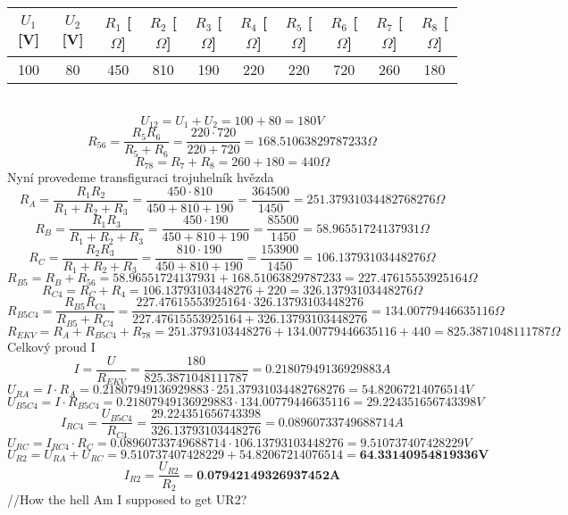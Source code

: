 \documentclass{article}
\begin{document}
\begin{tabular}{| c | c | c | c | c | c | c | c | c | c |}
  \hline
   $U_{1}$[V] & $U_{2}$ [V] & $R_{1}$ [$\Omega$]& $R_{2}$ [$\Omega$]& $R_{3}$ [$\Omega$]& $R_{4}$ [$\Omega$]& $R_{5}$ [$\Omega$]& $R_{6}$ [$\Omega$]& $R_{7}$ [$\Omega$]& $R_{8}$ [$\Omega$]\\
  \hline
  100 & 80 & 450 & 810 & 190 & 220 & 220 & 720 & 260 & 180\\
  \hline
\end{tabular}\\
\[
  U_{12} = U_{1} + U_{2} = 100 + 80 = 180V
\]
\[
  R_{56} = \displaystyle\frac{R_{5}R_{6}}{R_{5}+R_{6}}  = \displaystyle\frac{220 \cdot 720}{220 + 720} = 168.51063829787233 \Omega
\]
\[
  R_{78} = R_{7} + R_{8} = 260 + 180 = 440\Omega
\]
Nyní provedeme transfiguraci  trojuhelník hvězda
\[
  R_{A} = \displaystyle\frac{R_{1}R_{2}}{R_{1}+R_{2}+R_{3}}
  = \displaystyle\frac{450 \cdot 810}{450 + 810 + 190}
  = \displaystyle\frac{364500}{1450}
  = 251.37931034482768276 \Omega
\]
\[
  R_{B} = \displaystyle\frac{R_{1}R_{3}}{R_{1}+R_{2}+R_{3}}
  = \displaystyle\frac{450 \cdot 190}{450 + 810 + 190}
  = \displaystyle\frac{85500}{1450}
  = 58.96551724137931 \Omega
\]
\[
  R_{C} = \displaystyle\frac{R_{2}R_{3}}{R_{1}+R_{2}+R_{3}}
  = \displaystyle\frac{810 \cdot 190}{450 + 810 + 190}
  = \displaystyle\frac{153900}{1450}
  = 106.13793103448276 \Omega
\]
\[
  R_{B5} = R_{B} + R_{56} = 58.96551724137931 + 168.51063829787233 = 227.47615553925164 \Omega
\]
\[
  R_{C4} = R_{C} + R_{4} = 106.13793103448276 + 220 = 326.13793103448276 \Omega
\]
\[
  R_{B5C4} = \displaystyle\frac{R_{B5}R_{C4}}{R_{B5}+R_{C4}}
  = \displaystyle\frac{227.47615553925164 \cdot  326.13793103448276}{227.47615553925164 + 326.13793103448276}
  = 134.00779446635116 \Omega
\]
\[
  R_{EKV} = R_{A} + R_{B5C4} + R_{78} = 251.3793103448276 + 134.00779446635116 + 440
  = 825.3871048111787 \Omega
\]
Celkový proud I
\[
  I = \displaystyle\frac{U}{R_{EKV}} = \displaystyle\frac{180}{825.3871048111787} = 0.21807949136929883A
\]
\[
  U_{RA} = I \cdot R_A
  = 0.21807949136929883 \cdot 251.37931034482768276
  = 54.82067214076514V
\]
\[
  U_{B5C4} = I \cdot R_{B5C4}
 = 0.21807949136929883 \cdot 134.00779446635116
 = 29.224351656743398V
\]
\[
  I_{RC4} = \displaystyle\frac{U_{B5C4}}{R_{C4}} 
 = \displaystyle\frac{29.224351656743398}{326.13793103448276}
 = 0.08960733749688714 A
\] 
\[
  U_{RC} = I_{RC4} \cdot R_C
  = 0.08960733749688714  \cdot 106.13793103448276
  = 9.510737407428229 V
\]
\[
  U_{R2} = U_{RA} + U_{RC}
  = 9.510737407428229+54.82067214076514
  = \textbf{64.33140954819336V}
\]
\[
  I_{R2} = \displaystyle\frac{U_{R2}}{R_2}
  = \textbf{0.07942149326937452A}
\]
//How the hell Am I supposed to get UR2?
\end{document}
